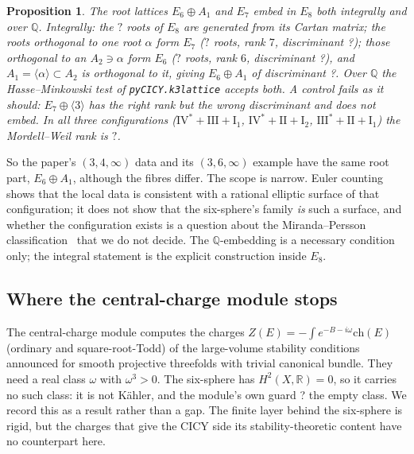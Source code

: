 \documentclass[11pt,a4paper]{article}
\newcommand{\SSERootsEight}{?}\newcommand{\SSERootsSeven}{?}
\newcommand{\SSERootsSix}{?}\newcommand{\SSEDiscSeven}{?}
\newcommand{\SSEDiscSix}{?}\newcommand{\SSEDiscSixA}{?}
\newcommand{\SSMWRank}{?}\newcommand{\SSGuardRefused}{?}
\newcommand{\QQ}{\mathbb{Q}}
\theoremstyle{plain}
\newtheorem{proposition}{Proposition}
\theoremstyle{definition}
\begin{document}
\begin{proposition}
\label{prop:roots}
The root lattices $E_6 \oplus A_1$ and $E_7$ embed in $E_8$ both integrally
and over $\QQ$. Integrally: the $\SSERootsEight$ roots of $E_8$ are generated
from its Cartan matrix; the roots orthogonal to one root $\alpha$ form $E_7$
($\SSERootsSeven$ roots, rank $7$, discriminant \SSEDiscSeven{}); those
orthogonal to an $A_2 \ni \alpha$ form $E_6$ ($\SSERootsSix$ roots, rank
$6$, discriminant \SSEDiscSix{}), and $A_1 = \langle \alpha \rangle \subset
A_2$ is orthogonal to it, giving $E_6 \oplus A_1$ of discriminant
\SSEDiscSixA{}. Over $\QQ$ the Hasse--Minkowski test of
\texttt{pyCICY.k3lattice} accepts both. A control fails as it should:
$E_7 \oplus \langle 3 \rangle$ has the right rank but the wrong
discriminant and does not embed. In all three configurations ($\mathrm{IV}^*
+ \mathrm{III} + \mathrm{I}_1$, $\mathrm{IV}^* + \mathrm{II} + \mathrm{I}_2$,
$\mathrm{III}^* + \mathrm{II} + \mathrm{I}_1$) the Mordell--Weil rank is
$\SSMWRank$.
\end{proposition}

So the paper's $(3,4,\infty)$ data and its $(3,6,\infty)$ example have the
same root part, $E_6 \oplus A_1$, although the fibres differ. The scope is
narrow. Euler counting shows that the local data is consistent with a
rational elliptic surface of that configuration; it does not show that the
six-sphere's family \emph{is} such a surface, and whether the configuration
exists is a question about the Miranda--Persson classification~\cite{MP86}
that we do not decide. The $\QQ$-embedding is a necessary condition only;
the integral statement is the explicit construction inside $E_8$.

\subsection{Where the central-charge module stops}
\label{sec:links-cc}

The central-charge module computes the charges $Z(E) = -\int e^{-B-i\omega}
\mathrm{ch}(E)$ (ordinary and square-root-Todd) of the large-volume
stability conditions announced for smooth projective threefolds with trivial
canonical bundle. They need a real class $\omega$ with $\omega^3 > 0$. The
six-sphere has $H^2(X,\mathbb{R}) = 0$, so it carries no such class: it is
not K\"ahler, and the module's own guard \SSGuardRefused{} the empty class. We record this as a result rather than a gap. The
finite layer behind the six-sphere is rigid, but the charges that give the
CICY side its stability-theoretic content have no counterpart here.
\end{document}
